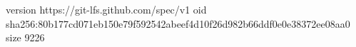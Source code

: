 version https://git-lfs.github.com/spec/v1
oid sha256:80b177cd071eb150e79f592542abeef4d10f26d982b66ddf0e0e38372ee08aa0
size 9226
